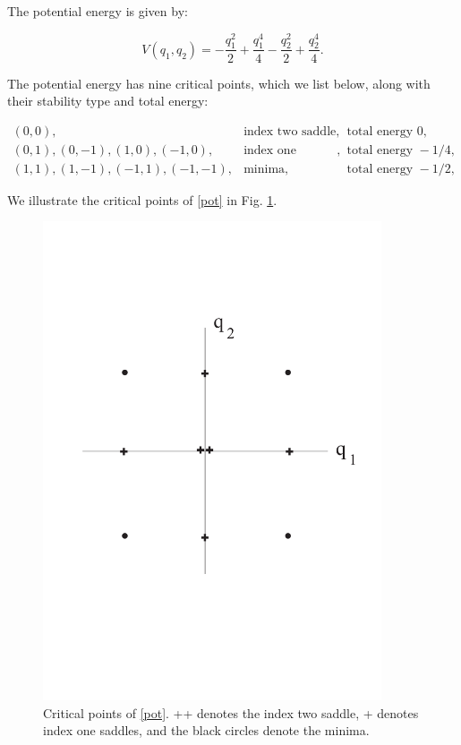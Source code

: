 \documentclass{article}
\begin{document}
\noindent
The potential energy is given by:

\begin{equation}
V(q_1, q_2) =  - \frac{q_1^2}{2} + \frac{q_1^4}{4}- \frac{q_2^2}{2} + \frac{q_2^4}{4}.
\label{pot}
\end{equation}

\noindent
The potential energy has nine critical points, which we list below, along with their stability type and total energy:

\begin{equation}
\begin{array}{cll}
(0,0), & \mbox{index two saddle}, & \mbox{total energy} \, \, 0,\\
(0,1), (0, -1), (1, 0), (-1, 0), & \mbox{index one saddles}, & \mbox{total energy} \, \,-{1}/{4} ,\\
(1, 1), (1, -1), (-1, 1), (-1, -1), & \mbox{minima}, & \mbox{total energy} \, \, -{1}/{2},
\end{array}
\end{equation}

\noindent
We illustrate the critical points of \eqref{pot} in Fig. \ref{fig:global DS 2}.

\begin{figure}[htb!]
\begin{center}
\includegraphics[width=10.0cm]{global_DS_2.pdf}
\end{center}
\caption{Critical points of \eqref{pot}. ++ denotes the index two saddle, + denotes index one saddles, and the black circles denote the minima.}
\label{fig:global DS 2}
\end{figure}
\end{document}
